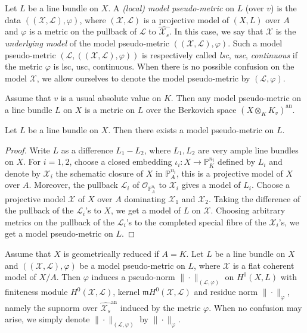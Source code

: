 \documentclass [11pt,reqno]{amsart}
\newcommand{\1}{\mathmybb{1}}
\def\cL{{\mathcal{L}}}
\def\cO{{\mathcal{O}}}
\def\cX{{\mathcal{X}}}
\def\m{\mathfrak m}
\def\an{\operatorname{an}}
\begin{document}
\begin{definition}
\label{def:local_pseudo-metric}
Let $L$ be a line bundle on $X$. A \emph{(local) model pseudo-metric} on $L$ (over $v$) is the data $((\cX,\cL),\varphi)$, where $(\cX,\cL)$ is a projective model of $(X,L)$ over $A$ and $\varphi$ is a metric on the pullback of $\cL$ to $\widehat{\cX_s}$. In this case, we say that $\cX$ is the \emph{underlying model} of the model pseudo-metric $((\cX,\cL),\varphi)$. Such a model pseudo-metric $(\cL,((\cX,\cL),\varphi))$ is respectively called \emph{lsc}, \emph{usc}, \emph{continuous} if the metric $\varphi$ is lsc, usc, continuous. When there is no possible confusion on the model $\cX$, we allow ourselves to denote the model pseudo-metric by $(\cL,\varphi)$.
\end{definition}

\begin{remark}
\label{rem:pseudo-metric_absolute_value}
Assume that $v$ is a usual absolute value on $K$. Then any model pseudo-metric on a line bundle $L$ on $X$ is a metric on $L$ over the Berkovich space $(X\otimes_{K} K_{v})^{\an}$. 
\end{remark}

\begin{proposition}
\label{prop:existence_local_model-pseudo-metrics}
Let $L$ be a line bundle on $X$. Then there exists a model pseudo-metric on $L$.
\end{proposition}

\begin{proof}
Write $L$ as a difference $L_{1}-L_{2}$, where $L_{1},L_{2}$ are very ample line bundles on $X$. For $i=1,2$, choose a closed embedding $\iota_{i}:X \to \mathbb{P}^{n_{i}}_{K}$ defined by $L_{i}$ and denote by $\cX_{i}$ the schematic closure of $X$ in $\mathbb{P}^{n_{i}}_{A}$, this is a projective model of $X$ over $A$. Moreover, the pullback $\cL_{i}$ of $\cO_{\mathbb{P}^{n_{i}}_{A}}$ to $\cX_{i}$ gives a model of $L_{i}$. Choose a projective model $\cX$ of $X$ over $A$ dominating $\cX_{1}$ and $\cX_{2}$. Taking the difference of the pullback of the $\cL_{i}$'s to $X$, we get a model of $L$ on $\cX$. Choosing arbitrary metrics on the pullback of the $\cL_{i}$'s to the completed special fibre of the $\cX_{i}$'s, we get a model pseudo-metric on $L$.
\end{proof}

\begin{proposition-definition}
\label{propdef:supnorm_pseudo-metric}
Assume that $X$ is geometrically reduced if $A=K$. Let $L$ be a line bundle on $X$ and $((\cX,\cL),\varphi)$ be a model pseudo-metric on $L$, where $\cX$ is a flat coherent model of $X/A$. Then $\varphi$ induces a pseudo-norm $\|\cdot\|_{(\cL,\varphi)}$ on $H^{0}(X,L)$ with finiteness module $H^{0}(\cX,\cL)$, kernel $\m H^{0}(\cX,\cL)$ and residue norm $\|\cdot\|_{\varphi}$, namely the supnorm over $\widehat{\cX_{s}}^{\an}$ induced by the metric $\varphi$. When no confusion may arise, we simply denote $\|\cdot\|_{(\cL,\varphi)}$ by $\|\cdot\|_{\varphi}$.
\end{proposition-definition}
\end{document}
